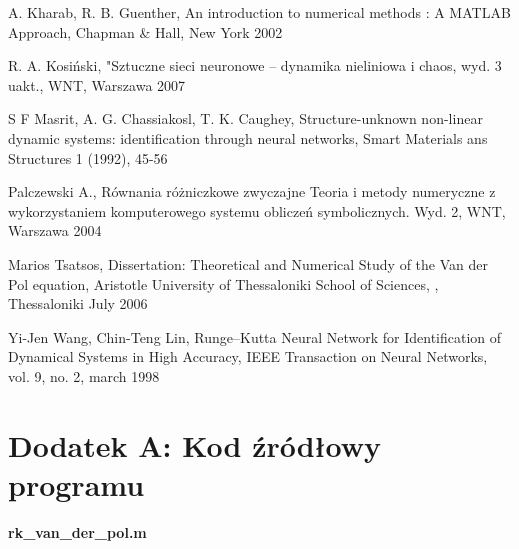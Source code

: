 \begin{thebibliography}{widest-label}
 A. Kharab, R. B. Guenther, An introduction to numerical methods : A MATLAB Approach, Chapman \& Hall, New York 2002

 R. A. Kosiński, "Sztuczne sieci neuronowe – dynamika nieliniowa i chaos, wyd. 3 uakt., WNT, Warszawa 2007

 S F Masrit, A. G. Chassiakosl, T. K. Caughey, Structure-unknown non-linear dynamic systems: identification through neural networks, Smart Materials ans Structures 1 (1992), 45-56

 Palczewski A., Równania różniczkowe zwyczajne
Teoria i metody numeryczne z wykorzystaniem komputerowego systemu obliczeń symbolicznych. Wyd. 2, WNT, Warszawa 2004

 Marios Tsatsos, Dissertation: Theoretical and Numerical Study of the Van der Pol equation, Aristotle University of Thessaloniki School of Sciences, , Thessaloniki July 2006

 Yi-Jen Wang, Chin-Teng Lin, Runge–Kutta Neural Network for Identification of Dynamical Systems in High Accuracy, IEEE Transaction on Neural Networks, vol. 9, no. 2, march 1998

\end{thebibliography}

\clearpage
{}
\section*{Dodatek A: Kod źródłowy programu}

\textbf{rk\_van\_der\_pol.m}

